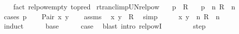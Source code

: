 \begin{isabellebody}
%
\isadelimproof
\ \ %
\endisadelimproof
%
\isatagproof
{}\isamarkupfalse%
\ {\isacharparenleft}{\kern0pt}fact\ relpow{\isacharunderscore}{\kern0pt}empty\ {\isacharbrackleft}{\kern0pt}to{\isacharunderscore}{\kern0pt}pred{\isacharbrackright}{\kern0pt}{\isacharparenright}{\kern0pt}%
\endisatagproof
{\isafoldproof}%
%
\isadelimproof
\isanewline
%
\endisadelimproof
\isanewline
{}\isamarkupfalse%
\ rtrancl{\isacharunderscore}{\kern0pt}imp{\isacharunderscore}{\kern0pt}UN{\isacharunderscore}{\kern0pt}relpow{\isacharcolon}{\kern0pt}\isanewline
\ \ \ {\isachardoublequoteopen}p\ {\isasymin}\ R\isactrlsup {\isacharasterisk}{\kern0pt}{\isachardoublequoteclose}\isanewline
\ \ \ {\isachardoublequoteopen}p\ {\isasymin}\ {\isacharparenleft}{\kern0pt}{\isasymUnion}n{\isachardot}{\kern0pt}\ R\ {\isacharcircum}{\kern0pt}{\isacharcircum}{\kern0pt}\ n{\isacharparenright}{\kern0pt}{\isachardoublequoteclose}\isanewline
%
\isadelimproof
%
\endisadelimproof
%
\isatagproof
{}\isamarkupfalse%
\ {\isacharparenleft}{\kern0pt}cases\ p{\isacharparenright}{\kern0pt}\isanewline
\ \ \isamarkupfalse%
\ {\isacharparenleft}{\kern0pt}Pair\ x\ y{\isacharparenright}{\kern0pt}\isanewline
\ \ \isamarkupfalse%
\ assms\ \isamarkupfalse%
\ {\isachardoublequoteopen}{\isacharparenleft}{\kern0pt}x{\isacharcomma}{\kern0pt}\ y{\isacharparenright}{\kern0pt}\ {\isasymin}\ R\isactrlsup {\isacharasterisk}{\kern0pt}{\isachardoublequoteclose}\ \isamarkupfalse%
\ simp\isanewline
\ \ \isamarkupfalse%
\ \isamarkupfalse%
\ {\isachardoublequoteopen}{\isacharparenleft}{\kern0pt}x{\isacharcomma}{\kern0pt}\ y{\isacharparenright}{\kern0pt}\ {\isasymin}\ {\isacharparenleft}{\kern0pt}{\isasymUnion}n{\isachardot}{\kern0pt}\ R\ {\isacharcircum}{\kern0pt}{\isacharcircum}{\kern0pt}\ n{\isacharparenright}{\kern0pt}{\isachardoublequoteclose}\isanewline
\ \ \isamarkupfalse%
\ induct\isanewline
\ \ \ \ \isamarkupfalse%
\ base\isanewline
\ \ \ \ \isamarkupfalse%
\ {\isacharquery}{\kern0pt}case\ \isamarkupfalse%
\ {\isacharparenleft}{\kern0pt}blast\ intro{\isacharcolon}{\kern0pt}\ relpow{\isacharunderscore}{\kern0pt}{}{\isacharunderscore}{\kern0pt}I{\isacharparenright}{\kern0pt}\isanewline
\ \ \isamarkupfalse%
\isanewline
\ \ \ \ \isamarkupfalse%
\ step\isanewline
\ \ \ \ \isamarkupfalse%
\ \isamarkupfalse%

\end{isabellebody}
